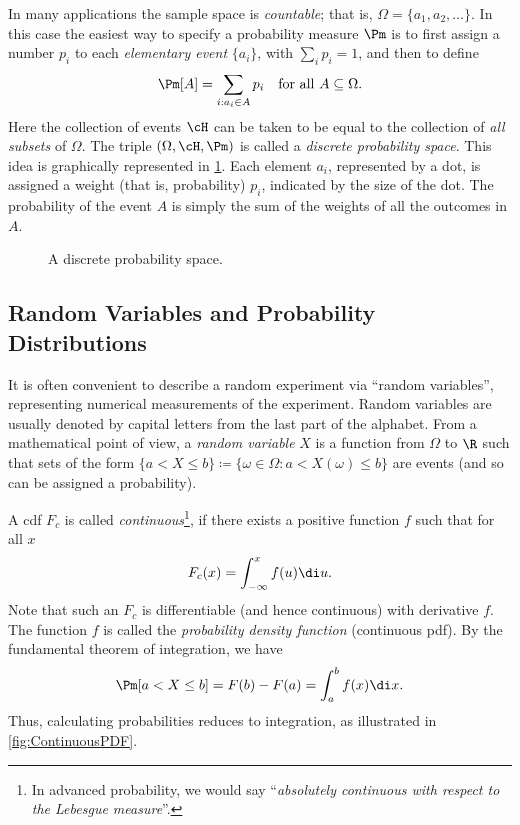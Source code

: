 In many applications the sample space is \textit{countable}; that is, \(\Omega = \{a_1, a_2, \dots\}\). In this case the easiest way to specify a probability measure \(\Pm\) is to first assign a number \(p_i\) to each \textit{elementary event} \(\{a_i\}\), with \(\sum_i p_i = 1\), and then to define
\begin{equation*}
	\Pm[A] = \sum_{i: a_i \in A} p_i \quad \text{for all } A \subseteq \Omega.
\end{equation*}
Here the collection of events \(\cH\) can be taken to be equal to the collection of \textit{all subsets} of \(\Omega\). The triple \((\Omega, \cH, \Pm)\) is called a \textit{discrete probability space}. This idea is graphically represented in \cref{fig:DiscreteProbSpace}. Each element \(a_i\), represented by a dot, is assigned a weight (that is, probability) \(p_i\), indicated by the size of the dot. The probability of the event \(A\) is simply the sum of the weights of all the outcomes in \(A\).

\begin{figure}[H]
	\centering
	
	\caption{A discrete probability space.}
	\label{fig:DiscreteProbSpace}
\end{figure}

\subsection{Random Variables and Probability Distributions}
It is often convenient to describe a random experiment via ``random variables'', representing numerical measurements of the experiment. Random variables are usually denoted by capital letters from the last part of the alphabet. From a mathematical point of view, a \textit{random variable} \(X\) is a function from \(\Omega\) to \(\R\) such that sets of the form \(\{a < X \le b\} \coloneqq \{\omega \in \Omega : a < X(\omega) \le b\}\) are events (and so can be assigned a probability).

A cdf \(F_c\) is called \textit{continuous}\footnote{In advanced probability, we would say ``\textit{absolutely continuous with respect to the Lebesgue measure}''.}, if there exists a positive function \(f\) such that for all \(x\)
\begin{equation}
	F_c(x) = \int_{-\infty}^x f(u) \di u. \label{eq:ContinuousCDF}
\end{equation}
Note that such an \(F_c\) is differentiable (and hence continuous) with derivative \(f\). The function \(f\) is called the \textit{probability density function} (continuous pdf). By the fundamental theorem of integration, we have
\begin{equation*}
	\Pm[a < X \le b] = F(b) - F(a) = \int_a^b f(x) \di x.
\end{equation*}
Thus, calculating probabilities reduces to integration, as illustrated in \cref{fig:ContinuousPDF}.

